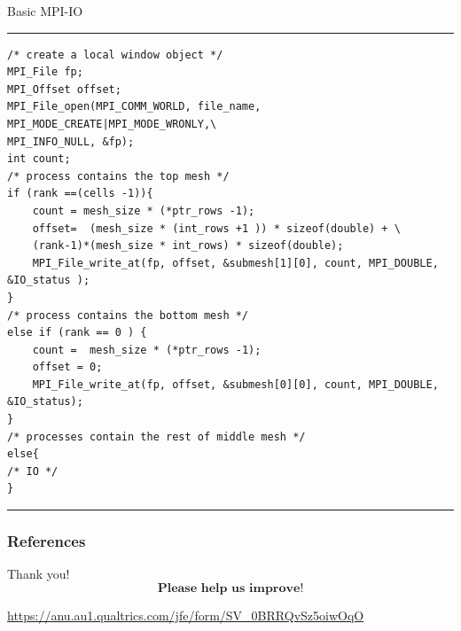 \documentclass[xcolor=dvipsnames]{beamer}
\begin{document}
\begin{frame}[fragile]{Basic MPI-IO}
\rule{\textwidth}{1pt}
\scriptsize
\begin{verbatim}
/* create a local window object */
MPI_File fp;
MPI_Offset offset; 
MPI_File_open(MPI_COMM_WORLD, file_name, MPI_MODE_CREATE|MPI_MODE_WRONLY,\ 
MPI_INFO_NULL, &fp);
int count;
/* process contains the top mesh */
if (rank ==(cells -1)){
    count = mesh_size * (*ptr_rows -1);
    offset=  (mesh_size * (int_rows +1 )) * sizeof(double) + \
    (rank-1)*(mesh_size * int_rows) * sizeof(double);
    MPI_File_write_at(fp, offset, &submesh[1][0], count, MPI_DOUBLE, &IO_status );
}
/* process contains the bottom mesh */
else if (rank == 0 ) {
    count =  mesh_size * (*ptr_rows -1);
    offset = 0;
    MPI_File_write_at(fp, offset, &submesh[0][0], count, MPI_DOUBLE, &IO_status);
}
/* processes contain the rest of middle mesh */
else{
/* IO */
}
\end{verbatim}
\rule{\textwidth}{1pt}
\end{frame}





\begin{frame}[allowframebreaks]
        \frametitle{References}
        
        
\end{frame}





\begin{frame}{Thank you!}
$$\textbf{Please help us improve!}$$

\url{https://anu.au1.qualtrics.com/jfe/form/SV_0BRRQvSz5oiwOqO}
\end{frame}
\end{document}

